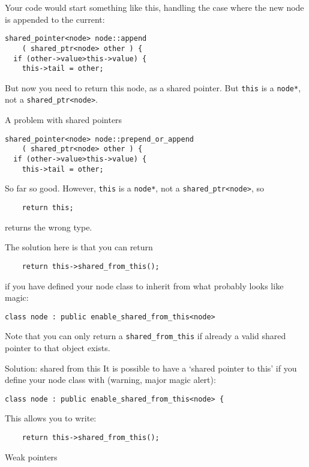Your code would start something
like this, handling the case where the new node is appended to the current:
\begin{lstlisting}
shared_pointer<node> node::append
    ( shared_ptr<node> other ) {
  if (other->value>this->value) {
    this->tail = other;
\end{lstlisting}
But now you need to return this node, as a shared pointer. But
\lstinline{this} is a \lstinline{node*}, not a \lstinline{shared_ptr<node>}.

\begin{slide}{A problem with shared pointers}
  \label{sl:share-ptr-node-sh}
\begin{lstlisting}
shared_pointer<node> node::prepend_or_append
    ( shared_ptr<node> other ) {
  if (other->value>this->value) {
    this->tail = other;
\end{lstlisting}
So far so good. However, \lstinline{this} is a \lstinline{node*}, not a
\lstinline{shared_ptr<node>}, so
\begin{lstlisting}
    return this;
\end{lstlisting}
returns the wrong type.
\end{slide}

The solution here is that you can return
\begin{lstlisting}
    return this->shared_from_this();
\end{lstlisting}
if you have defined your node class to inherit from what probably
looks like magic:
\begin{lstlisting}
class node : public enable_shared_from_this<node>
\end{lstlisting}

Note that you can only return a \lstinline+shared_from_this+
if already a valid shared pointer to that object exists.

\begin{slide}{Solution: shared from this}
  \label{sl:share-ptr-node-from}
  It is possible to have a `shared pointer to this' if you
  define your node class with (warning, major magic alert):
\begin{lstlisting}
class node : public enable_shared_from_this<node> {
\end{lstlisting}
This allows you to write:
\begin{lstlisting}
    return this->shared_from_this();
\end{lstlisting}
\end{slide}

 {Weak pointers}
\label{sec:weak_ptr}

